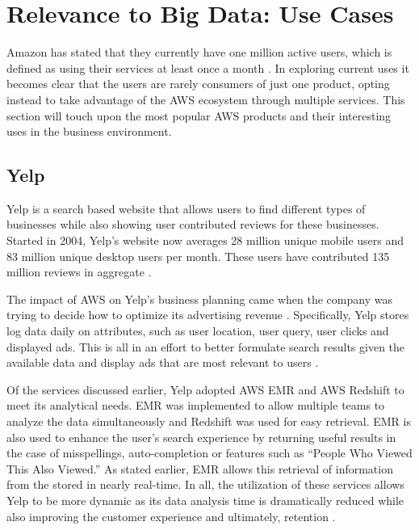 \documentclass[sigconf]{acmart}
\begin{document}
\section{Relevance to Big Data: Use Cases}
Amazon has stated that they currently have one million active users, which is defined as using their services at least once a month \cite{bezos}. In exploring current uses it becomes clear that the users are rarely consumers of just one product, opting instead to take advantage of the AWS ecosystem through multiple services. This section will touch upon the most popular AWS products and their interesting uses in the business environment.
\subsection{Yelp}
Yelp is a search based website that allows users to find different types of businesses while also showing user contributed reviews for these businesses. Started in 2004, Yelp's website now averages 28 million unique mobile users and 83 million unique desktop users per month. These users have contributed 135 million reviews in aggregate \cite{yelp}. 

The impact of AWS on Yelp's business planning came when the company was trying to decide how to optimize its advertising revenue \cite{yelpaws}. Specifically, Yelp stores log data daily on attributes, such as user location, user query, user clicks and displayed ads. This is all in an effort to better formulate search results given the available data and display ads that are most relevant to users \cite{yelpceo}. 

Of the services discussed earlier, Yelp adopted AWS EMR and AWS Redshift to meet its analytical needs. EMR was implemented to allow multiple teams to analyze the data simultaneously and Redshift was used for easy retrieval. EMR is also used to enhance the user's search experience by returning useful results in the case of misspellings, auto-completion or features such as ``People Who Viewed This Also Viewed.''\cite{yelpeng} As stated earlier, EMR allows this retrieval of information from the stored in nearly real-time. In all, the utilization of these services allows Yelp to be more dynamic as its data analysis time is dramatically reduced while also improving the customer experience and ultimately, retention \cite{yelphbr}. 
\end{document}
